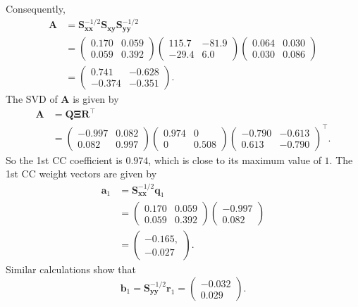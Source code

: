 \documentclass[]{book}
\theoremstyle{definition}
\theoremstyle{definition}
\theoremstyle{definition}
\theoremstyle{remark}
\begin{document}
Consequently,
\begin{align*}
\boldsymbol A&=\boldsymbol S_{\boldsymbol x\boldsymbol x}^{-1/2}\boldsymbol S_{\boldsymbol x\boldsymbol y}\boldsymbol S_{\boldsymbol y\boldsymbol y}^{-1/2}\\
&=\begin{pmatrix} 0.170 & 0.059\\0.059  &  0.392 \end{pmatrix}
\begin{pmatrix} 115.7  & -81.9\\ -29.4 & 6.0   \end{pmatrix}
\begin{pmatrix} 0.064 & 0.030\\0.030 &  0.086 \end{pmatrix}\\
&=\begin{pmatrix} 0.741 & -0.628\\-0.374 &  -0.351\end{pmatrix}.
\end{align*}
The SVD of \(\boldsymbol A\) is given by
\begin{align}
\boldsymbol A&=\boldsymbol Q{\pmb \Xi} \boldsymbol R^\top \nonumber \\
&=\begin{pmatrix} -0.997 & 0.082\\ 0.082 & 0.997   \end{pmatrix}
\begin{pmatrix}  0.974 & 0 \\0 & 0.508 \end{pmatrix}
\begin{pmatrix} -0.790 & -0.613\\ 0.613 & -0.790 \end{pmatrix}^\top.
\label{eq:SVDanalysis}
\end{align}
So the 1st CC coefficient is \(0.974\), which is close to its maximum value of \(1\). The 1st CC weight vectors are
given by
\begin{align*}
\boldsymbol a_1&=\boldsymbol S_{\boldsymbol x\boldsymbol x}^{-1/2}\boldsymbol q_1\\
&=\begin{pmatrix} 0.170 & 0.059\\0.059  &  0.392 \end{pmatrix} \begin{pmatrix} -0.997 \\ 0.082\end{pmatrix}\\
&=\begin{pmatrix}  -0.165, \\ - 0.027 \end{pmatrix}.
\end{align*}
Similar calculations show that
\[
\boldsymbol b_1=\boldsymbol S_{\boldsymbol y\boldsymbol y}^{-1/2}\boldsymbol r_1=\begin{pmatrix}  -0.032 \\ 0.029\end{pmatrix}.
\]
\end{document}
